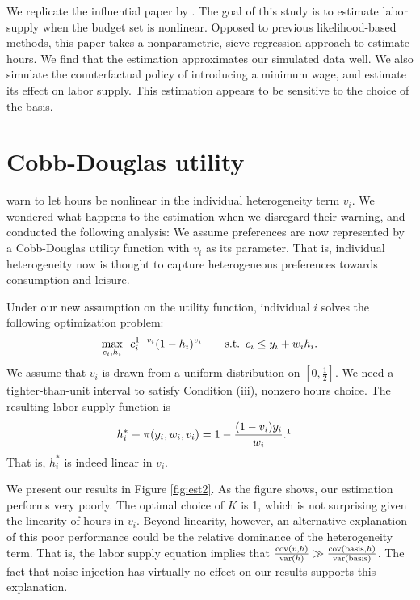 \documentclass[11pt,letterpaper]{article}                  %
\begin{document}
We replicate the influential paper by \citet{Blomquist2002}.
The goal of this study is to estimate labor supply when the budget set is nonlinear.
Opposed to previous likelihood-based methods, this paper takes a nonparametric, sieve regression approach to estimate hours.
We find that the estimation approximates our simulated data well.
We also simulate the counterfactual policy of introducing a minimum wage, and estimate its effect on labor supply.
This estimation appears to be sensitive to the choice of the basis.





\newpage

\appendix

\section{Cobb-Douglas utility}
\label{app:CD}

\citet{Blomquist2002} warn to let hours be nonlinear in the individual heterogeneity term $v_i$.
We wondered what happens to the estimation when we disregard their warning, and conducted the following analysis:
We assume preferences are now represented by a Cobb-Douglas utility function with $v_i$ as its parameter.
That is, individual heterogeneity now is thought to capture heterogeneous preferences towards consumption and leisure.

Under our new assumption on the utility function, individual $i$ solves the following optimization problem:
\begin{align*}
	\max_{c_i, h_i} \enskip c_i^{1-v_i} (1-h_i)^{v_i} \qquad \text{s.t.} \enskip c_i \leq y_i + w_i h_i.
\end{align*}
We assume that $v_i$ is drawn from a uniform distribution on $\left[ 0, \tfrac{1}{2} \right]$.
We need a tighter-than-unit interval to satisfy Condition (iii), nonzero hours choice.
The resulting labor supply function is
\begin{align*}
	h^*_i &\equiv \pi (y_i, w_i, v_i) = 1 - \frac{(1-v_i) y_i}{w_i}.\footnotemark
\end{align*}
That is, $h^*_i$ is indeed linear in $v_i$.

We present our results in Figure \ref{fig:est2}.
As the figure shows, our estimation performs very poorly.
The optimal choice of $K$ is 1, which is not surprising given the linearity of hours in $v_i$.
Beyond linearity, however, an alternative explanation of this poor performance could be the relative dominance of the heterogeneity term.
That is, the labor supply equation implies that $\frac{\operatorname{cov} (v, h)}{\operatorname{var} (h)} \gg \frac{\operatorname{cov} (\text{basis}, h)}{\operatorname{var} (\text{basis})}$.
The fact that noise injection has virtually no effect on our results supports this explanation.
\end{document}
